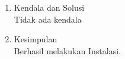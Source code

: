 \\
\\

\begin{enumerate}
\item Kendala dan Solusi
\\ Tidak ada kendala

\item Kesimpulan
\\ Berhasil melakukan Instalasi.

\end{enumerate}

